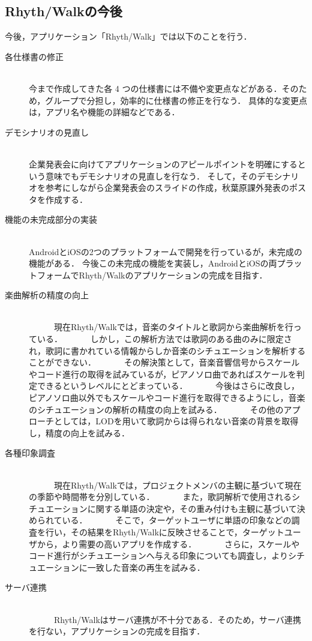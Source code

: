 \subsection{Rhyth/Walkの今後}
\par
今後，アプリケーション「Rhyth/Walk」では以下のことを行う．

\begin{description}
 \item[各仕様書の修正]\mbox{}\\ 
	    今まで作成してきた各 4 つの仕様書には不備や変更点などがある．そのため，グループで分担し，効率的に仕様書の修正を行なう．
	    具体的な変更点は，アプリ名や機能の詳細などである．
	    
 \item[デモシナリオの見直し]\mbox{}\\
	    企業発表会に向けてアプリケーションのアピールポイントを明確にするという意味でもデモシナリオの見直しを行なう．
	    そして，そのデモシナリオを参考にしながら企業発表会のスライドの作成，秋葉原課外発表のポスタを作成する．

 \item[機能の未完成部分の実装]\mbox{}\\
	    AndroidとiOSの2つのプラットフォームで開発を行っているが，未完成の機能がある．
	    今後この未完成の機能を実装し，AndroidとiOSの両プラットフォームでRhyth/Walkのアプリケーションの完成を目指す．

\item[楽曲解析の精度の向上]\mbox{}\\
　　　現在Rhyth/Walkでは，音楽のタイトルと歌詞から楽曲解析を行っている．
　　　しかし，この解析方法では歌詞のある曲のみに限定され，歌詞に書かれている情報からしか音楽のシチュエーションを解析することができない．
　　　その解決策として，音楽音響信号からスケールやコード進行の取得を試みているが，ピアノソロ曲であればスケールを判定できるというレベルにとどまっている．
　　　今後はさらに改良し，ピアノソロ曲以外でもスケールやコード進行を取得できるようにし，音楽のシチュエーションの解析の精度の向上を試みる．
　　　その他のアプローチとしては，LODを用いて歌詞からは得られない音楽の背景を取得し，精度の向上を試みる．
　　　
\item[各種印象調査]\mbox{}\\
　　　現在Rhyth/Walkでは，プロジェクトメンバの主観に基づいて現在の季節や時間帯を分別している．
　　　また，歌詞解析で使用されるシチュエーションに関する単語の決定や，その重み付けも主観に基づいて決められている．
　　　そこで，ターゲットユーザに単語の印象などの調査を行い，その結果をRhyth/Walkに反映させることで，ターゲットユーザから，より需要の高いアプリを作成する．
　　　さらに，スケールやコード進行がシチュエーションへ与える印象についても調査し，よりシチュエーションに一致した音楽の再生を試みる．
　　　
\item[サーバ連携]\mbox{}\\
　　　Rhyth/Walkはサーバ連携が不十分である．そのため，サーバ連携を行ない，アプリケーションの完成を目指す．


\end{description}
